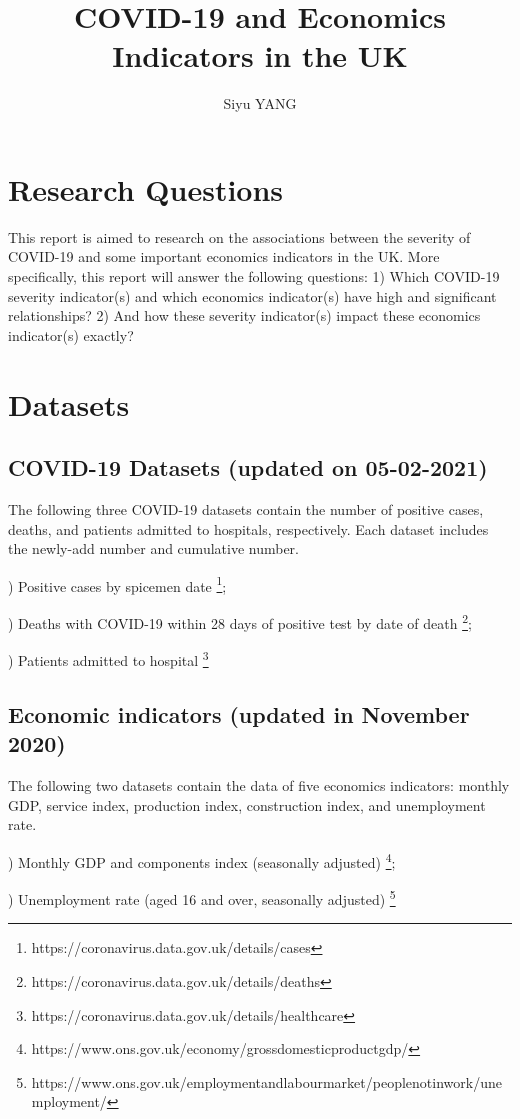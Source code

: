 \documentclass[12pt, a4paper]{report}
\title{COVID-19 and Economics Indicators in the UK}
\author{Siyu YANG}
\date{}
\begin{document}
\maketitle

\section{Research Questions}
This report is aimed to research on the associations between the severity of COVID-19 and some important 
economics indicators in the UK. More specifically, this report will answer the following questions:
1) Which COVID-19 severity indicator(s) and which economics indicator(s) have high and significant relationships?
2) And how these severity indicator(s) impact these economics indicator(s) exactly?


\section{Datasets}
\subsection{COVID-19 Datasets (updated on 05-02-2021)}
The following three COVID-19 datasets contain the number of positive cases, deaths, and patients admitted to hospitals, 
respectively. Each dataset includes the newly-add number and cumulative number.\par
{}) Positive cases by spicemen date
\footnote[1]{https://coronavirus.data.gov.uk/details/cases};\par
{}) Deaths with COVID-19 within 28 days of positive test by date of death
\footnote[2]{https://coronavirus.data.gov.uk/details/deaths};\par
{}) Patients admitted to hospital
\footnote[3]{https://coronavirus.data.gov.uk/details/healthcare}\par

\subsection{Economic indicators (updated in November 2020)} 
The following two datasets contain the data of five economics indicators: monthly GDP, service index, 
production index, construction index, and unemployment rate.\par
{}) Monthly GDP and components index (seasonally adjusted)
\footnote[4]{https://www.ons.gov.uk/economy/grossdomesticproductgdp/};\par
{}) Unemployment rate (aged 16 and over, seasonally adjusted)
\footnote[5]{https://www.ons.gov.uk/employmentandlabourmarket/peoplenotinwork/unemployment/}
\end{document}
